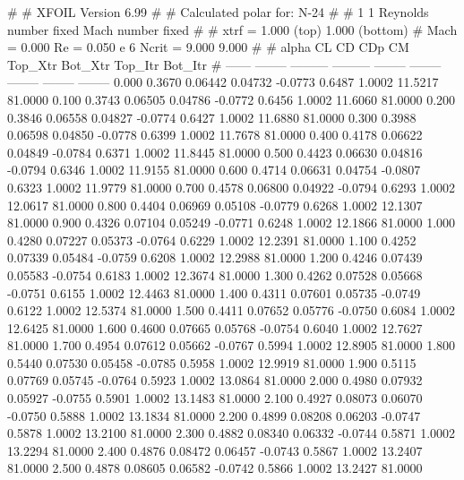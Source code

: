 #  
#       XFOIL         Version 6.99
#  
# Calculated polar for: N-24                                            
#  
# 1 1 Reynolds number fixed          Mach number fixed         
#  
# xtrf =   1.000 (top)        1.000 (bottom)  
# Mach =   0.000     Re =     0.050 e 6     Ncrit =   9.000  9.000
#  
#   alpha    CL        CD       CDp       CM     Top_Xtr  Bot_Xtr  Top_Itr  Bot_Itr
#  ------ -------- --------- --------- -------- -------- -------- -------- --------
   0.000   0.3670   0.06442   0.04732  -0.0773   0.6487   1.0002  11.5217  81.0000
   0.100   0.3743   0.06505   0.04786  -0.0772   0.6456   1.0002  11.6060  81.0000
   0.200   0.3846   0.06558   0.04827  -0.0774   0.6427   1.0002  11.6880  81.0000
   0.300   0.3988   0.06598   0.04850  -0.0778   0.6399   1.0002  11.7678  81.0000
   0.400   0.4178   0.06622   0.04849  -0.0784   0.6371   1.0002  11.8445  81.0000
   0.500   0.4423   0.06630   0.04816  -0.0794   0.6346   1.0002  11.9155  81.0000
   0.600   0.4714   0.06631   0.04754  -0.0807   0.6323   1.0002  11.9779  81.0000
   0.700   0.4578   0.06800   0.04922  -0.0794   0.6293   1.0002  12.0617  81.0000
   0.800   0.4404   0.06969   0.05108  -0.0779   0.6268   1.0002  12.1307  81.0000
   0.900   0.4326   0.07104   0.05249  -0.0771   0.6248   1.0002  12.1866  81.0000
   1.000   0.4280   0.07227   0.05373  -0.0764   0.6229   1.0002  12.2391  81.0000
   1.100   0.4252   0.07339   0.05484  -0.0759   0.6208   1.0002  12.2988  81.0000
   1.200   0.4246   0.07439   0.05583  -0.0754   0.6183   1.0002  12.3674  81.0000
   1.300   0.4262   0.07528   0.05668  -0.0751   0.6155   1.0002  12.4463  81.0000
   1.400   0.4311   0.07601   0.05735  -0.0749   0.6122   1.0002  12.5374  81.0000
   1.500   0.4411   0.07652   0.05776  -0.0750   0.6084   1.0002  12.6425  81.0000
   1.600   0.4600   0.07665   0.05768  -0.0754   0.6040   1.0002  12.7627  81.0000
   1.700   0.4954   0.07612   0.05662  -0.0767   0.5994   1.0002  12.8905  81.0000
   1.800   0.5440   0.07530   0.05458  -0.0785   0.5958   1.0002  12.9919  81.0000
   1.900   0.5115   0.07769   0.05745  -0.0764   0.5923   1.0002  13.0864  81.0000
   2.000   0.4980   0.07932   0.05927  -0.0755   0.5901   1.0002  13.1483  81.0000
   2.100   0.4927   0.08073   0.06070  -0.0750   0.5888   1.0002  13.1834  81.0000
   2.200   0.4899   0.08208   0.06203  -0.0747   0.5878   1.0002  13.2100  81.0000
   2.300   0.4882   0.08340   0.06332  -0.0744   0.5871   1.0002  13.2294  81.0000
   2.400   0.4876   0.08472   0.06457  -0.0743   0.5867   1.0002  13.2407  81.0000
   2.500   0.4878   0.08605   0.06582  -0.0742   0.5866   1.0002  13.2427  81.0000
